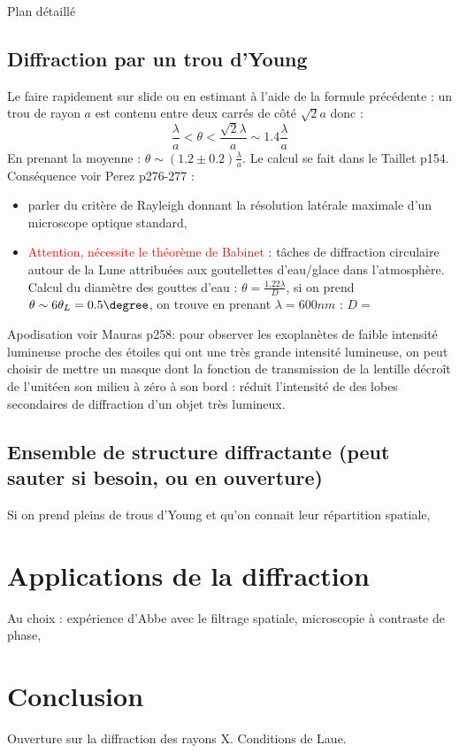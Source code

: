 \begin{reportBlock}{Plan détaillé}
  \subsection{Diffraction par un trou d'Young}
  Le faire rapidement sur slide ou en estimant à l'aide de la formule précédente : un trou de rayon $a$ est contenu entre deux carrés de côté $\sqrt{2}a$ donc :
  \begin{equation}
      \frac{\lambda}{a} < \theta < \frac{\sqrt{2}\lambda}{a}\sim 1.4\frac{\lambda}{a}
  \end{equation}
  En prenant la moyenne : $\theta \sim (1.2\pm0.2)\frac{\lambda}{a}$. Le calcul se fait dans le Taillet p154.\\
  Conséquence voir Perez p276-277 : 
  \begin{itemize}
      \item parler du critère de Rayleigh donnant la résolution latérale maximale d'un microscope optique standard,
      \item \textcolor{red}{Attention, nécessite le théorème de Babinet} : tâches de diffraction circulaire autour de la Lune attribuées aux goutellettes d'eau/glace dans l'atmosphère. Calcul du diamètre des gouttes d'eau : $\theta=\frac{1.22\lambda}{D}$, si on prend $\theta\sim6\theta_{L}=0.5\degree$, on trouve en prenant $\lambda=600nm$ : $D=\frac{}{}$
  \end{itemize}
  Apodisation voir Mauras p258: pour observer les exoplanètes de faible intensité lumineuse proche des étoiles qui ont une très grande intensité lumineuse, on peut choisir de mettre un masque dont la fonction de transmission de la lentille décroît de l'unitéen son milieu à zéro à son bord : réduit l'intensité de des lobes secondaires de diffraction d'un objet très lumineux.
  
  \subsection{Ensemble de structure diffractante (peut sauter si besoin, ou en ouverture)}
  Si on prend pleins de trous d'Young et qu'on connait leur répartition spatiale, 

  \section{Applications de la diffraction}
  Au choix : expérience d'Abbe avec le filtrage spatiale, microscopie à contraste de phase,
  \section{}

  \section*{Conclusion}
  Ouverture sur la diffraction des rayons X. Conditions de Laue.

\end{reportBlock}